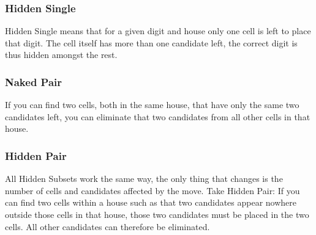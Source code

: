 \documentclass{mcmthesis}
\begin{document}
\subsubsection{Hidden Single}
Hidden Single means that for a given digit and house only one cell is left to place that digit. The cell itself has more than one candidate left, the correct digit is thus hidden amongst the rest.

\subsubsection{Naked Pair}
If you can find two cells, both in the same house, that have only the same two candidates left, you can eliminate that two candidates from all other cells in that house.

\subsubsection{Hidden Pair}
All Hidden Subsets work the same way, the only thing that changes is the number of cells and candidates affected by the move. Take Hidden Pair: If you can find two cells within a house such as that two candidates appear nowhere outside those cells in that house, those two candidates must be placed in the two cells. All other candidates can therefore be eliminated.
\end{document}
